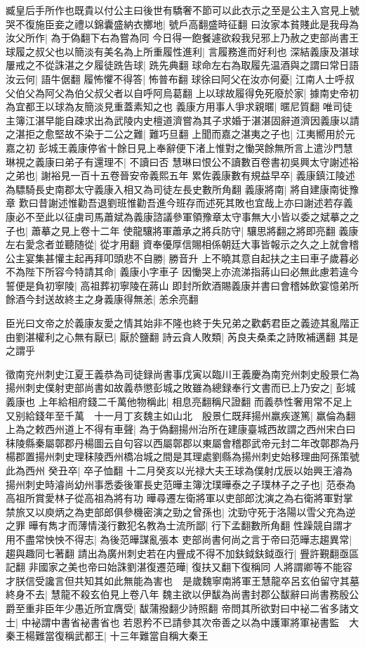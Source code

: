 臧皇后手所作也既貴以付公主曰後世有驕奢不節可以此衣示之至是公主入宫見上號哭不復施臣妾之禮以錦囊盛納衣擲地|{
	號戶高翻盛時征翻}
曰汝家本貧賤此是我母為汝父所作|{
	為于偽翻下右為嘗為同}
今日得一飽餐遽欲殺我兒邪上乃赦之吏部尚書王球履之叔父也以簡淡有美名為上所重履性進利|{
	言履務進而好利也}
深結義康及湛球屢戒之不從誅湛之夕履徒跣告球|{
	跣先典翻}
球命左右為取履先温酒與之謂曰常日語汝云何|{
	語牛倨翻}
履怖懼不得答|{
	怖普布翻}
球徐曰阿父在汝亦何憂|{
	江南人士呼叔父伯父為阿父為伯父叔父者以自呼阿烏葛翻}
上以球故履得免死廢於家|{
	據南史帝初為宜都王以球為友簡淡見重蓋素知之也}
義康方用事人爭求親暱|{
	暱尼質翻}
唯司徒主簿江湛早能自疎求出為武陵内史檀道濟嘗為其子求婚于湛湛固辭道濟因義康以請之湛拒之愈堅故不染于二公之難|{
	難巧旦翻}
上聞而嘉之湛夷之子也|{
	江夷嚮用於元嘉之初}
彭城王義康停省十餘日見上奉辭便下渚上惟對之慟哭餘無所言上遣沙門慧琳視之義康曰弟子有還理不|{
	不讀曰否}
慧琳曰恨公不讀數百卷書初吳興太守謝述裕之弟也|{
	謝裕見一百十五卷晉安帝義熙五年}
累佐義康數有規益早卒|{
	義康鎮江陵述為驃騎長史南郡太守義康入相又為司徒左長史數所角翻}
義康將南|{
	將自建康南徙豫章}
歎曰昔謝述惟勸吾退劉班惟勸吾進今班存而述死其敗也宜哉上亦曰謝述若存義康必不至此以征虜司馬蕭斌為義康諮議參軍領豫章太守事無大小皆以委之斌摹之之子也|{
	蕭摹之見上卷十二年}
使龍驤將軍蕭承之將兵防守|{
	驤思將翻之將即亮翻}
義康左右愛念者並聽随從|{
	從才用翻}
資奉優厚信賜相係朝廷大事皆報示之久之上就會稽公主宴集甚懽主起再拜叩頭悲不自勝|{
	勝音升}
上不曉其意自起扶之主曰車子歲暮必不為陛下所容今特請其命|{
	義康小字車子}
因慟哭上亦流涕指蔣山曰必無此慮若違今誓便是負初寧陵|{
	高祖葬初寧陵在蔣山}
即封所飲酒賜義康并書曰會稽姊飲宴憶弟所餘酒今封送故終主之身義康得無恙|{
	恙余亮翻}


臣光曰文帝之於義康友愛之情其始非不隆也終于失兄弟之歡虧君臣之義迹其亂階正由劉湛權利之心無有厭已|{
	厭於鹽翻}
詩云貪人敗類|{
	芮良夫桑柔之詩敗補邁翻}
其是之謂乎

徵南兖州刺史江夏王義恭為司徒録尚書事戊寅以臨川王義慶為南兖州刺史殷景仁為揚州刺史僕射吏部尚書如故義恭懲彭城之敗雖為總録奉行文書而已上乃安之|{
	彭城義康也}
上年給相府錢二千萬他物稱此|{
	相息亮翻稱尺證翻}
而義恭性奢用常不足上又别給錢年至千萬　十一月丁亥魏主如山北　殷景仁既拜揚州羸疾遂篤|{
	羸倫為翻}
上為之敕西州道上不得有車聲|{
	為于偽翻揚州治所在建康臺城西故謂之西州宋白曰秣陵縣秦屬鄣郡丹楊圖云自句容以西屬鄣郡以東屬會稽郡武帝元封二年改鄣郡為丹楊郡置揚州刺史理秣陵西州橋冶城之間是其理處劉縣為揚州刺史始移理曲阿孫策號此為西州}
癸丑卒|{
	卒子恤翻}
十二月癸亥以光禄大夫王球為僕射戊辰以始興王濬為揚州刺史時濬尚幼州事悉委後軍長史范曄主簿沈璞曄泰之子璞林子之子也|{
	范泰為高祖所賞愛林子從高祖為將有功}
曄尋遷左衛將軍以吏部郎沈演之為右衛將軍對掌禁旅又以庾炳之為吏部郎俱參機密演之勁之曾孫也|{
	沈勁守死于洛陽以雪父充為逆之罪}
曄有雋才而薄情淺行數犯名教為士流所鄙|{
	行下孟翻數所角翻}
性躁競自謂才用不盡常怏怏不得志|{
	為後范曄謀亂張本}
吏部尚書何尚之言于帝曰范曄志趨異常|{
	趨與趣同七著翻}
請出為廣州刺史若在内舋成不得不加鈇鉞鈇鉞亟行|{
	舋許覲翻亟區記翻}
非國家之美也帝曰始誅劉湛復遷范曄|{
	復扶又翻下復稱同}
人將謂卿等不能容才朕信受讒言但共知其如此無能為害也　是歲魏寧南將軍王慧龍卒呂玄伯留守其墓終身不去|{
	慧龍不殺玄伯見上卷八年}
魏主欲以伊馛為尚書封郡公馛辭曰尚書務殷公爵至重非臣年少愚近所宜膺受|{
	馛蒲撥翻少詩照翻}
帝問其所欲對曰中袐二省多諸文士|{
	中袐謂中書省袐書省也}
若恩矜不已請參其次帝善之以為中護軍將軍袐書監　大秦王楊難當復稱武都王|{
	十三年難當自稱大秦王}


